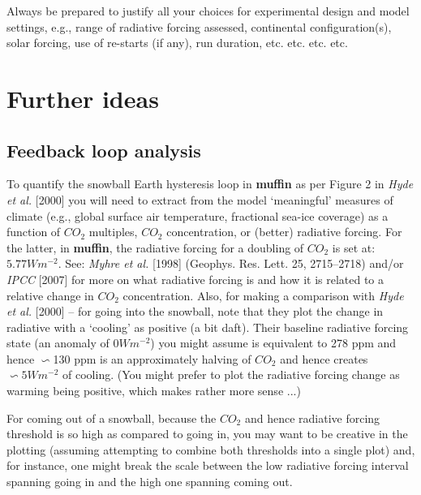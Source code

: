 \documentclass[11pt,fleqn]{book} %
\begin{document}
Always be prepared to justify all your choices for experimental design and model settings, e.g., range of radiative forcing assessed, continental configuration(s), solar forcing, use of re-starts (if any), run duration, etc. etc. etc. etc.


\newpage


\section{Further ideas}


\subsection{Feedback loop analysis}

To quantify the snowball Earth hysteresis loop in \textbf{muffin} as per Figure 2 in \textit{Hyde et al.} [2000] you will need to extract from the model ‘meaningful’ measures of climate (e.g., global surface air temperature, fractional sea-ice coverage) as a function of \(CO_{2}\) multiples, \(CO_{2}\) concentration, or (better) radiative forcing. For the latter, in \textbf{muffin}, the radiative forcing for a doubling of \(CO_{2}\) is set at: \(5.77 Wm^{-2}\). See: \textit{Myhre et al.} [1998] (Geophys. Res. Lett. 25, 2715–2718) and/or \textit{IPCC} [2007] for more on what radiative forcing is and how it is related to a relative change in \(CO_{2}\) concentration. Also, for making a comparison with \textit{Hyde et al.} [2000] -- for going into the snowball, note that they plot the change in radiative with a ‘cooling’ as positive (a bit daft). Their baseline radiative forcing state (an anomaly of \(0 Wm^{-2}\)) you might assume is equivalent to 278 ppm and hence \(\backsim\)130 ppm is an approximately halving of \(CO_{2}\) and hence creates \(\backsim5 Wm^{-2}\) of cooling. (You might prefer to plot the radiative forcing change as warming being positive, which makes rather more sense ...)

For coming out of a snowball, because the \(CO_{2}\) and hence radiative forcing threshold is so high as compared to going in, you may want to be creative in the plotting (assuming attempting to combine both thresholds into a single plot) and, for instance, one might break the scale between the low radiative forcing interval spanning going in and the high one spanning coming out.
\end{document}
